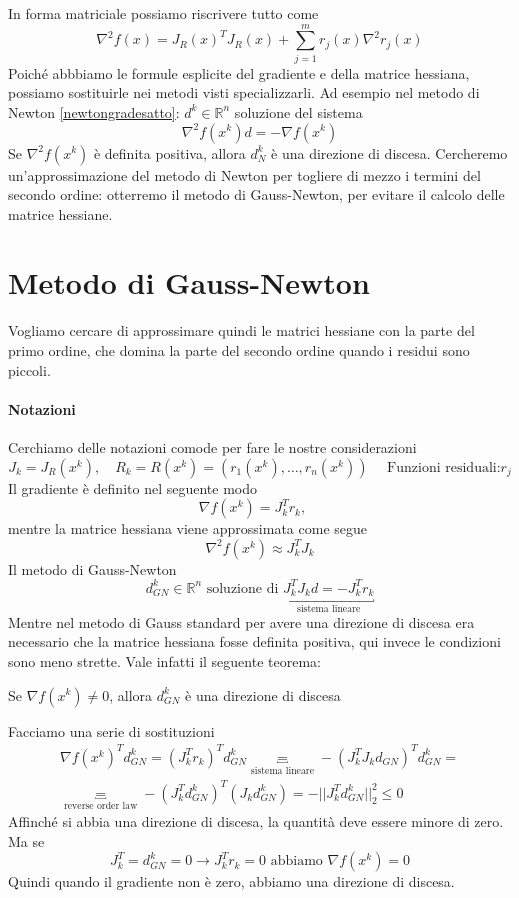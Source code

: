 In forma matriciale possiamo riscrivere tutto come
$$ \nabla^{2}f(x) = J_R(x)^{T}J_R(x) + 
 \displaystyle \sum_{j=1}^{m} r_j(x) \nabla^{2} r_j(x)$$
Poich\'e abbbiamo le formule esplicite del gradiente e della matrice
hessiana, possiamo sostituirle nei metodi visti
specializzarli.  Ad esempio nel metodo di Newton \ref{newtongradesatto}: $d^{k} \in
\mathbb{R}^{n}$ soluzione del sistema
$$ \nabla^{2}f(x^{k})d = - \nabla f(x^{k}) $$
Se $\nabla^{2} f(x^{k})$ è definita positiva, allora $d_{N}^{k}$ è una
direzione di discesa.  Cercheremo un'approssimazione del metodo di
Newton per togliere di mezzo i termini del secondo ordine: otterremo
il metodo di Gauss-Newton, per evitare il calcolo delle matrice
hessiane.

\section{Metodo di Gauss-Newton}
Vogliamo cercare di approssimare quindi le matrici hessiane con 
la parte del primo ordine, che domina la parte del secondo
ordine quando i residui sono piccoli.

\paragraph{Notazioni}
Cerchiamo delle notazioni comode per fare le nostre
considerazioni
$$ J_k = J_{R}(x^{k}), \quad R_k = R(x^k)= (r_1(x^{k}), \ldots,
r_n(x^{k}))
\quad
\text{ Funzioni residuali:$r_j$
}
$$
Il gradiente \`e definito nel seguente modo
$$ \nabla f(x^{k}) = J_{k}^{T}r_k,\quad$$
mentre la matrice hessiana viene approssimata
come segue
$$\nabla^{2}f(x^{k}) \approx J_k^{T}J_k $$
Il metodo di Gauss-Newton 
$$ d^{k}_{GN} \in \mathbb{R}^{n} 
\text{ soluzione di } \underbracket{J_{k}^{T}J_kd = - J_k^{T}r_k}_{\text{sistema lineare}}$$
Mentre nel metodo di Gauss standard per avere una direzione di discesa
era necessario che la matrice hessiana fosse definita positiva,
qui invece le condizioni sono meno strette.
Vale infatti il seguente teorema:

\begin{theo}
Se $\nabla f(x^{k}) \neq 0$, allora $d_{GN}^{k}$ è una direzione
di discesa
\end{theo}
\begin{thproof}
Facciamo una serie di sostituzioni
$$ 
\begin{array}{l}
\nabla f(x^{k})^{T}d_{GN}^{k} = 
(J_k^{T}r_k)^{T} d_{GN}^{k}  \underbracket{=}_{\text{sistema lineare}} 
-(J_k^{T} J_{k} d_{GN})^{T} d_{GN}^{k} = \\
\underbracket{=}_{\text{reverse order law}} 
-(J_{k}^{T} d_{GN}^{k})^{T}(J_{k}d_{GN}^{k})
= - ||J_k^{T} d_{GN}^{k}||_{2}^{2} \leq 0 
\end{array}
$$
Affinch\'e si abbia una direzione di discesa,
la quantit\`a deve essere minore di zero.
Ma se
$$ J_{k}^{T} = d_{GN}^{k} = 0 \rightarrow
J_{k}^{T}r_k = 0 \text{ abbiamo } \nabla f(x^{k}) = 0 $$
Quindi quando il gradiente non \`e zero, abbiamo una
direzione di discesa.
\end{thproof}

